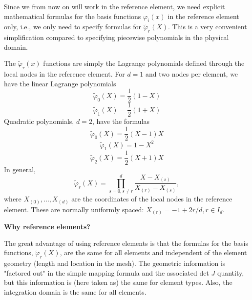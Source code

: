 \documentclass[../main.tex]{subfiles}
\begin{document}
Since we from now on will work in the reference element, we need explicit mathematical formulas for the basis functions $\varphi_{i}(x)$ in the reference element only, i.e., we only need to specify formulas for $\tilde{\varphi}_{r}(X)$. This is a very convenient simplification compared to specifying piecewise polynomials in the physical domain.

The $\tilde{\varphi}_{r}(x)$ functions are simply the Lagrange polynomials defined through the local nodes in the reference element. For $d=1$ and two nodes per element, we have the linear Lagrange polynomials
\begin{equation}\label{eqa67}
	\tilde{\varphi}_{0}(X) =\frac{1}{2}(1-X)
\end{equation}
\begin{equation}\label{eqa68}
	\tilde{\varphi}_{1}(X) =\frac{1}{2}(1+X)
\end{equation}
Quadratic polynomials, $d=2$, have the formulas
\begin{equation}\label{eqa69}
	\tilde{\varphi}_{0}(X) =\frac{1}{2}(X-1) X
\end{equation}
\begin{equation}\label{eqa70}
	\tilde{\varphi}_{1}(X) =1-X^{2}
\end{equation}
\begin{equation}\label{eqa71}
	\tilde{\varphi}_{2}(X) =\frac{1}{2}(X+1)X
\end{equation}
In general,
\begin{equation}\label{eqa72}
	\tilde{\varphi}_{r}(X)=\prod_{s=0, s \neq r}^{d} \frac{X-X_{(s)}}{X_{(r)}-X_{(s)}},
\end{equation}
where $X_{(0)}, \ldots, X_{(d)}$ are the coordinates of the local nodes in the reference element. These are normally uniformly spaced: $X_{(r)}=-1+2 r / d, r \in I_{d}$.
\begin{mybox}
	\textbf{Why reference elements?}
	
	\noindent The great advantage of using reference elements is that the formulas for the basis functions, $\tilde{\varphi}_{r}(X)$, are the same for all elements and independent of the element geometry (length and location in the mesh). The geometric information is "factored out" in the simple mapping formula and the associated det $J$ quantity, but this information is (here taken as) the same for element types. Also, the integration domain is the same for all elements.
\end{mybox}
\end{document}
